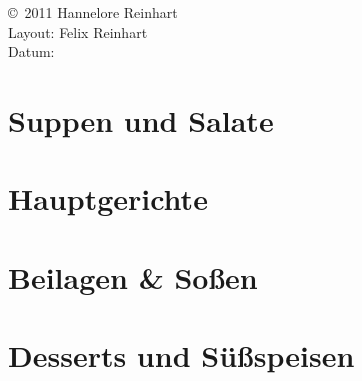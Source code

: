 \documentclass[a4paper,11pt,twoside]{report}
\begin{document}
\begin{minipage}[b!]{\textwidth}
\begin{flushleft}
\flushbottom \copyright \ 2011 Hannelore Reinhart\\
Layout: Felix Reinhart\\
Datum: \date{\today}
\end{flushleft}
\end{minipage}

\setcounter{page}{1}
\tableofcontents
\pagestyle{fancy}
\cleardoublepage


\chapter{Suppen und Salate}
\minitoc




\chapter{Hauptgerichte}
\minitoc








\chapter{Beilagen \& Soßen}
\minitoc


\chapter{Desserts und Süßspeisen}
\minitoc







\cleardoublepage
\pagestyle{empty}
\cleardoublepage
\newpage
\phantom{blub}
\newpage
\pagecolor{yellow} %
\end{document}
